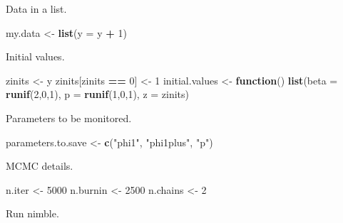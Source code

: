 \documentclass[
  12pt,
]{krantz}
\newenvironment{Shaded}{\begin{snugshade}}{\end{snugshade}}
\newcommand{\AttributeTok}[1]{\textcolor[rgb]{0.13,0.29,0.53}{#1}}
\newcommand{\ControlFlowTok}[1]{\textcolor[rgb]{0.13,0.29,0.53}{\textbf{#1}}}
\newcommand{\DecValTok}[1]{\textcolor[rgb]{0.00,0.00,0.81}{#1}}
\newcommand{\FunctionTok}[1]{\textcolor[rgb]{0.13,0.29,0.53}{\textbf{#1}}}
\newcommand{\NormalTok}[1]{#1}
\newcommand{\OtherTok}[1]{\textcolor[rgb]{0.56,0.35,0.01}{#1}}
\newcommand{\SpecialCharTok}[1]{\textcolor[rgb]{0.81,0.36,0.00}{\textbf{#1}}}
\newcommand{\StringTok}[1]{\textcolor[rgb]{0.31,0.60,0.02}{#1}}
\begin{document}
Data in a list.

\begin{Shaded}
\begin{Highlighting}[]
\NormalTok{my.data }\OtherTok{\textless{}{-}} \FunctionTok{list}\NormalTok{(}\AttributeTok{y =}\NormalTok{ y }\SpecialCharTok{+} \DecValTok{1}\NormalTok{)}
\end{Highlighting}
\end{Shaded}

Initial values.

\begin{Shaded}
\begin{Highlighting}[]
\NormalTok{zinits }\OtherTok{\textless{}{-}}\NormalTok{ y}
\NormalTok{zinits[zinits }\SpecialCharTok{==} \DecValTok{0}\NormalTok{] }\OtherTok{\textless{}{-}} \DecValTok{1}
\NormalTok{initial.values }\OtherTok{\textless{}{-}} \ControlFlowTok{function}\NormalTok{() }\FunctionTok{list}\NormalTok{(}\AttributeTok{beta =} \FunctionTok{runif}\NormalTok{(}\DecValTok{2}\NormalTok{,}\DecValTok{0}\NormalTok{,}\DecValTok{1}\NormalTok{),}
                                  \AttributeTok{p =} \FunctionTok{runif}\NormalTok{(}\DecValTok{1}\NormalTok{,}\DecValTok{0}\NormalTok{,}\DecValTok{1}\NormalTok{),}
                                  \AttributeTok{z =}\NormalTok{ zinits)}
\end{Highlighting}
\end{Shaded}

Parameters to be monitored.

\begin{Shaded}
\begin{Highlighting}[]
\NormalTok{parameters.to.save }\OtherTok{\textless{}{-}} \FunctionTok{c}\NormalTok{(}\StringTok{"phi1"}\NormalTok{, }\StringTok{"phi1plus"}\NormalTok{, }\StringTok{"p"}\NormalTok{)}
\end{Highlighting}
\end{Shaded}

MCMC details.

\begin{Shaded}
\begin{Highlighting}[]
\NormalTok{n.iter }\OtherTok{\textless{}{-}} \DecValTok{5000}
\NormalTok{n.burnin }\OtherTok{\textless{}{-}} \DecValTok{2500}
\NormalTok{n.chains }\OtherTok{\textless{}{-}} \DecValTok{2}
\end{Highlighting}
\end{Shaded}

Run nimble.
\end{document}
